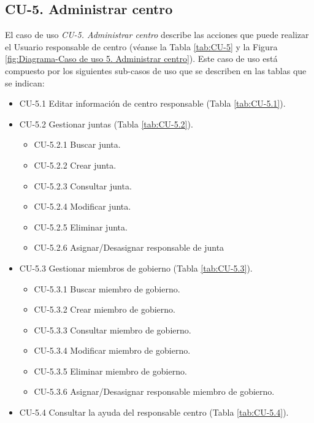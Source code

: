 \newpage


\subsection{CU-5. Administrar centro}\label{sec:CU-5}    
El caso de uso \textit{CU-5. Administrar centro} describe las acciones que puede realizar el Usuario responsable de centro (véanse la Tabla \ref{tab:CU-5} y la Figura \ref{fig:Diagrama-Caso de uso 5. Administrar centro}). Este caso de uso está compuesto por los siguientes sub-casos de uso que se describen en las tablas que se indican:
\begin{itemize}
  \item CU-5.1 Editar información de centro responsable (Tabla \ref{tab:CU-5.1}).
  \item CU-5.2 Gestionar juntas (Tabla \ref{tab:CU-5.2}).
          \begin{itemize}
            \item CU-5.2.1 Buscar junta.
            \item CU-5.2.2 Crear junta.
            \item CU-5.2.3 Consultar junta.
            \item CU-5.2.4 Modificar junta.
            \item CU-5.2.5 Eliminar junta.
            \item CU-5.2.6 Asignar/Desasignar responsable de junta 

        \end{itemize}
  \item CU-5.3 Gestionar miembros de gobierno (Tabla \ref{tab:CU-5.3}).
          \begin{itemize}
            \item CU-5.3.1 Buscar miembro de gobierno.
            \item CU-5.3.2 Crear  miembro de gobierno.
            \item CU-5.3.3 Consultar miembro de gobierno.
            \item CU-5.3.4 Modificar miembro de gobierno.
            \item CU-5.3.5 Eliminar miembro de gobierno.
            \item CU-5.3.6 Asignar/Desasignar responsable miembro de gobierno.
        \end{itemize}
  
 \item CU-5.4 Consultar la ayuda del responsable centro (Tabla \ref{tab:CU-5.4}).
\end{itemize}


